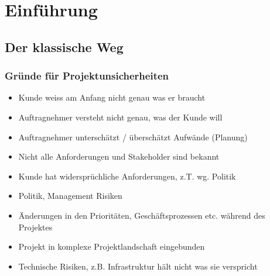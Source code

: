\section{Einführung}

\subsection{Der klassische Weg}
\frame
{
  \frametitle{Gründe für Projektunsicherheiten}
  \begin{itemize}
    \item{Kunde weiss am Anfang nicht genau was er braucht}
    \item{Auftragnehmer versteht nicht genau, was der Kunde will}
    \item{Auftragnehmer unterschätzt / überschätzt Aufwände (Planung)}
    \item{Nicht alle Anforderungen und Stakeholder sind bekannt}
    \item{Kunde hat widersprüchliche Anforderungen, z.T. wg. Politik}
    \item{Politik, Management Risiken}
    \item{Änderungen in den Prioritäten, Geschäftsprozessen etc. während des Projektes}
    \item{Projekt in komplexe Projektlandschaft eingebunden}
    \item{Technische Risiken, z.B. Infrastruktur hält nicht was sie verspricht}
  \end{itemize}
}



